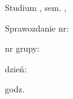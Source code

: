 \begin{center}
    \begin{bf}
        \begin{Huge}
            \schoolName
            \linebreak\linebreak\linebreak
            \instituteName
            \linebreak\linebreak\linebreak
            \subjectName
            \linebreak
            \classesType
        \end{Huge}
        \begin{huge}
            \linebreak\linebreak\linebreak\linebreak\linebreak\linebreak
            Studium \studium, sem. \semester, \academicYear
            \linebreak\linebreak\linebreak\linebreak\linebreak\linebreak\linebreak\linebreak\linebreak
        \end{huge}
    \end{bf}
    \begin{Huge}
        \begin{bf}Sprawozdanie nr: \end{bf}\reportNumber
        \linebreak\linebreak\linebreak
        \begin{bf}nr grupy: \end{bf}\groupNumber
        \linebreak\linebreak\linebreak
        \begin{bf}dzień: \end{bf}\dayOfTheClasses
        \linebreak\linebreak\linebreak
        \begin{bf}godz. \end{bf}\timeOfTheClasses
    \end{Huge}
    \linebreak\linebreak\linebreak\linebreak\linebreak\linebreak\linebreak\linebreak\linebreak
\end{center}
